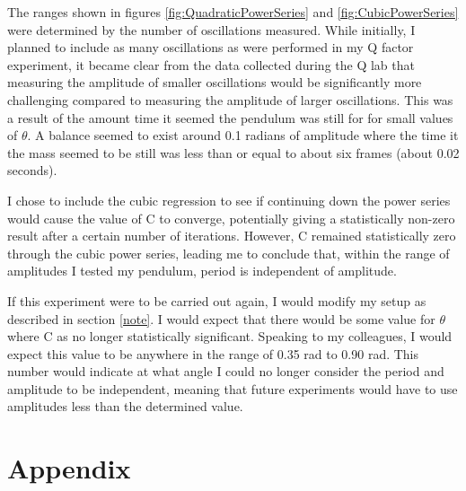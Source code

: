 \documentclass[11pt]{article}
\begin{document}
        The ranges shown in figures \ref{fig:QuadraticPowerSeries} and \ref{fig:CubicPowerSeries} were determined by the number of oscillations measured. While initially, I planned to include as many oscillations as were performed in my Q factor experiment, it became clear from the data collected during the Q lab that measuring the amplitude of smaller oscillations would be significantly more challenging compared to measuring the amplitude of larger oscillations. This was a result of the amount time it seemed the pendulum was still for for small values of $\theta$. A balance seemed to exist around 0.1 radians of amplitude where the time it the mass seemed to be still was less than or equal to about six frames (about 0.02 seconds).   

        I chose to include the cubic regression to see if continuing down the power series would cause the value of C to converge, potentially giving a statistically non-zero result after a certain number of iterations. However, C remained statistically zero through the cubic power series, leading me to conclude that, within the range of amplitudes I tested my pendulum, period is independent of amplitude. 
        
        If this experiment were to be carried out again, I would modify my setup as described in section \ref{note}. I would expect that there would be some value for $\theta$ where C as no longer statistically significant. Speaking to my colleagues, I would expect this value to be anywhere in the range of 0.35 rad to 0.90 rad. This number would indicate at what angle I could no longer consider the period and amplitude to be independent, meaning that future experiments would have to use amplitudes less than the determined value.

    \section{Appendix}
\end{document}
